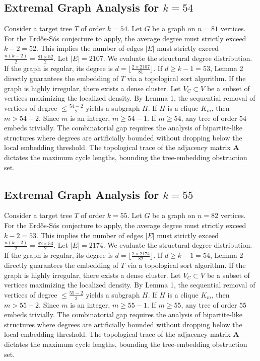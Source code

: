 \documentclass[11pt,a4paper]{article}
\begin{document}
\subsection{Extremal Graph Analysis for $k=54$}
Consider a target tree $T$ of order $k=54$.
Let $G$ be a graph on $n=81$ vertices.
For the Erd\H{o}s-S\'os conjecture to apply, the average degree must strictly exceed $k-2 = 52$.
This implies the number of edges $|E|$ must strictly exceed $\frac{n(k-2)}{2} = \frac{81 \times 52}{2}$.
Let $|E| = 2107$.
We evaluate the structural degree distribution. If the graph is regular, its degree is $d = \lfloor \frac{2 \times 2107}{81} \rfloor$.
If $d \geq k-1 = 53$, Lemma 2 directly guarantees the embedding of $T$ via a topological sort algorithm.
If the graph is highly irregular, there exists a dense cluster. Let $V_C \subset V$ be a subset of vertices maximizing the localized density.
By Lemma 1, the sequential removal of vertices of degree $\leq \frac{54-2}{2}$ yields a subgraph $H$.
If $H$ is a clique $K_{m}$, then $m > 54-2$. Since $m$ is an integer, $m \geq 54-1$. If $m \geq 54$, any tree of order $54$ embeds trivially.
The combinatorial gap requires the analysis of bipartite-like structures where degrees are artificially bounded without dropping below the local embedding threshold. The topological trace of the adjacency matrix $\mathbf{A}$ dictates the maximum cycle lengths, bounding the tree-embedding obstruction set.


\subsection{Extremal Graph Analysis for $k=55$}
Consider a target tree $T$ of order $k=55$.
Let $G$ be a graph on $n=82$ vertices.
For the Erd\H{o}s-S\'os conjecture to apply, the average degree must strictly exceed $k-2 = 53$.
This implies the number of edges $|E|$ must strictly exceed $\frac{n(k-2)}{2} = \frac{82 \times 53}{2}$.
Let $|E| = 2174$.
We evaluate the structural degree distribution. If the graph is regular, its degree is $d = \lfloor \frac{2 \times 2174}{82} \rfloor$.
If $d \geq k-1 = 54$, Lemma 2 directly guarantees the embedding of $T$ via a topological sort algorithm.
If the graph is highly irregular, there exists a dense cluster. Let $V_C \subset V$ be a subset of vertices maximizing the localized density.
By Lemma 1, the sequential removal of vertices of degree $\leq \frac{55-2}{2}$ yields a subgraph $H$.
If $H$ is a clique $K_{m}$, then $m > 55-2$. Since $m$ is an integer, $m \geq 55-1$. If $m \geq 55$, any tree of order $55$ embeds trivially.
The combinatorial gap requires the analysis of bipartite-like structures where degrees are artificially bounded without dropping below the local embedding threshold. The topological trace of the adjacency matrix $\mathbf{A}$ dictates the maximum cycle lengths, bounding the tree-embedding obstruction set.
\end{document}
